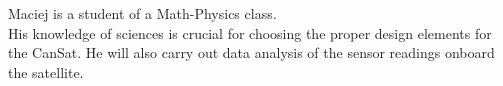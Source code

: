 \documentclass[class=report, crop=false]{standalone}
\begin{document}
Maciej is a student of a Math-Physics class. \\
His knowledge of sciences is crucial for choosing the proper design elements for the CanSat. He will also carry out data analysis of the sensor readings onboard the satellite.
\end{document}
